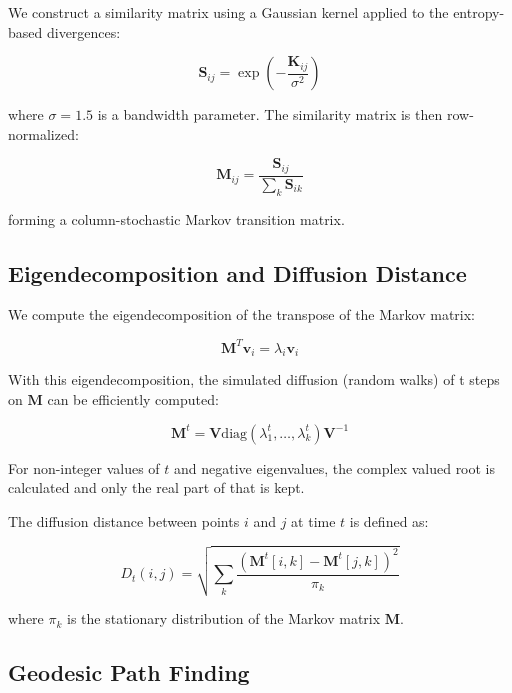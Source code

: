 \documentclass[12pt,a4paper]{article}
\begin{document}
We construct a similarity matrix using a Gaussian kernel applied to the entropy-based divergences:

\begin{equation}
\mathbf{S}_{ij} = \exp\left(-\frac{\mathbf{K}_{ij}}{\sigma^2}\right)
\end{equation}

where $\sigma = 1.5$ is a bandwidth parameter. The similarity matrix is then row-normalized:

\begin{equation}
\mathbf{M}_{ij} = \frac{\mathbf{S}_{ij}}{\sum_{k} \mathbf{S}_{ik}}
\end{equation}

forming a column-stochastic Markov transition matrix.

\subsection{Eigendecomposition and Diffusion Distance}

We compute the eigendecomposition of the transpose of the Markov matrix:

\begin{equation}
\mathbf{M}^T \mathbf{v}_i = \lambda_i \mathbf{v}_i
\end{equation}

With this eigendecomposition, the simulated diffusion (random walks) of t steps on $\mathbf{M}$ can be efficiently computed:

\begin{equation}
\mathbf{M}^t = \mathbf{V} \text{diag}(\lambda_1^t, \ldots, \lambda_k^t) \mathbf{V}^{-1}
\end{equation}

For non-integer values of $t$ and negative eigenvalues, the complex valued root is calculated and only the real part of that is kept.

The diffusion distance \cite{coifman2006diffusion} between points $i$ and $j$ at time $t$ is defined as:

\begin{equation}
D_t(i,j) = \sqrt{\sum_{k} \frac{(\mathbf{M}^t[i,k] - \mathbf{M}^t[j,k])^2}{\pi_k}}
\end{equation}

where $\pi_k$ is the stationary distribution of the Markov matrix $\mathbf{M}$.

\subsection{Geodesic Path Finding}
\end{document}
